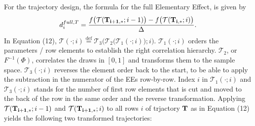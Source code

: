 \documentclass[a4paper,12pt]{article}
\newcommand*{\defeq}{\stackrel{\text{def}}{=}}
\begin{document}
\noindent 
For the trajectory design, the formula for the full Elementary Effect, is given by
\begin{align}
d_i^{full,T} = \frac{f\big(\mathcal{T}(\bold{T_{i+1,*}}; i-1)\big) - f\big(\mathcal{T}(\bold{T_{i,*}}; i)\big)}{\Delta}.
\end{align}
In Equation (12), $\mathcal{T}(\cdot; i) \defeq \mathcal{T}_3\bigg(\mathcal{T}_2\big(\mathcal{T}_1(\cdot; i)\big); i\bigg)$. $\mathcal{T}_1(\cdot; i)$ orders the parameters / row elements to establish the right correlation hierarchy. $\mathcal{T}_2$, or $F^{-1}(\Phi)$, correlates the draws in $[0,1]$ and transforms them to the sample space. $\mathcal{T}_3(\cdot; i)$ reverses the element order back to the start, to be able to apply the subtraction in the numerator of the EEs row-by-row. Index $i$ in $\mathcal{T}_1(\cdot; i)$ and $\mathcal{T}_3(\cdot; i)$ stands for the number of first row elements that is cut and moved to the back of the row in the same order and the reverse transformation. Applying $\mathcal{T}(\bold{T_{i+1,*}}; i-1)$ and $\mathcal{T}(\bold{T_{i+1,*}}; i)$ to all rows $i$ of trjactory $\bold{T}$ as in Equation (12) yields the following two transformed trajectories:
\end{document}
